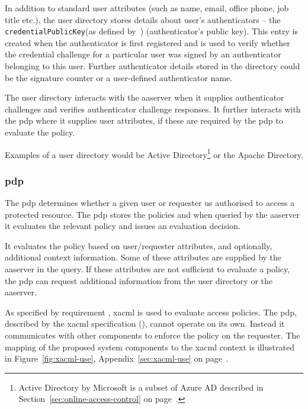 In addition to standard user attributes (such as name, email, office phone, job title etc.), the user directory stores details about user's authenticators -- the \texttt{credentialPublicKey}(as defined by~\cite{Balfanz2019Web1}) (authenticator's public key). This entry is created when the authenticator is first registered and is used to verify whether the credential challenge for a particular user was signed by an authenticator belonging to this user. Further authenticator details stored in the directory could be the signature counter or a user-defined authenticator name.

The user directory interacts with the \acrshort{aaserver} when it supplies authenticator challenges and verifies authenticator challenge responses. It further interacts with the \acrshort{pdp} where it supplies user attributes, if these are required by the \acrshort{pdp} to evaluate the policy.

Examples of a user directory would be Active Directory\footnote{Active Directory by Microsoft is a subset of Azure AD described in Section~\ref{sec:online-access-control} on page~\pageref{sec:online-access-control}.} or the Apache Directory\footnotemark.
% 
    
\subsubsection{\acrlong{pdp}}
The \acrfull{pdp} determines whether a given user or requester us authorised to access a protected resource. The \acrshort{pdp} stores the policies and when queried by the \acrshort{aaserver} it evaluates the relevant policy and issues an evaluation decision.

It evaluates the policy based on user/requester attributes, and optionally, additional context information. Some of these attributes are supplied by the \acrshort{aaserver} in the query. If these attributes are not sufficient to evaluate a policy, the \acrshort{pdp} can request additional information from the user directory or the \acrshort{aaserver}.

As specified by requirement
, \acrshort{xacml} is used to evaluate access policies. The \acrshort{pdp}, described by the \acrshort{xacml} specification (\cite{OASISStandard2013EXtensible3.0}), cannot operate on its own. Instead it communicates with other components to enforce the policy on the requester. The mapping of the proposed system components to the \acrshort{xacml} context is illustrated in Figure~\ref{fig:xacml-use}, Appendix~\ref{sec:xacml-use} on page~\pageref{fig:xacml-use}.

